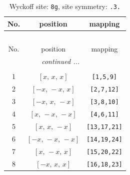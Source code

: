 \documentclass[fleqn,8pt]{jsarticle}
\begin{document}
\renewcommand{\arraystretch}{1.2}
\begin{longtable}{ccc}
\caption{Wyckoff site: {\tt 8g}, site symmetry: {\tt .3.}}
 \\
 \hline \hline
No. & position & mapping \\ \hline \endfirsthead

\multicolumn{2}{l}{\tablename\ \thetable{}} \\
 \hline \hline
No. & position & mapping \\ \hline \endhead

 \hline \hline
\multicolumn{2}{r}{\footnotesize\it continued ...} \\ \endfoot

 \hline \hline
\multicolumn{2}{r}{} \\ \endlastfoot

1 & $\left[ x,\, x,\, x \right]$ & {\tt [1,5,9]} \\ \hline
2 & $\left[ - x,\, - x,\, x \right]$ & {\tt [2,7,12]} \\ \hline
3 & $\left[ - x,\, x,\, - x \right]$ & {\tt [3,8,10]} \\ \hline
4 & $\left[ x,\, - x,\, - x \right]$ & {\tt [4,6,11]} \\ \hline
5 & $\left[ x,\, x,\, - x \right]$ & {\tt [13,17,21]} \\ \hline
6 & $\left[ - x,\, - x,\, - x \right]$ & {\tt [14,19,24]} \\ \hline
7 & $\left[ x,\, - x,\, x \right]$ & {\tt [15,20,22]} \\ \hline
8 & $\left[ - x,\, x,\, x \right]$ & {\tt [16,18,23]} \\
\end{longtable}
\renewcommand{\arraystretch}{1.2}
\end{document}

